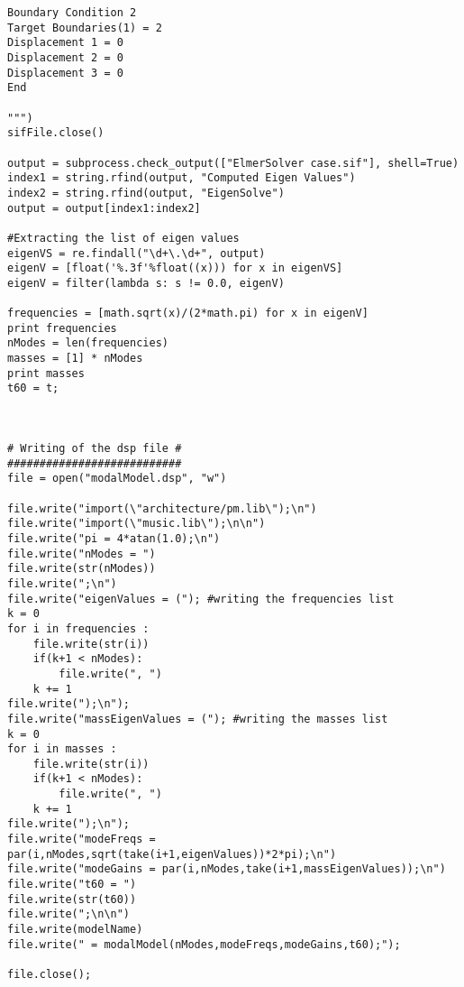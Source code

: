 \begin{lstlisting}
Boundary Condition 2
Target Boundaries(1) = 2
Displacement 1 = 0
Displacement 2 = 0
Displacement 3 = 0
End

""")
sifFile.close()
           
output = subprocess.check_output(["ElmerSolver case.sif"], shell=True)
index1 = string.rfind(output, "Computed Eigen Values")
index2 = string.rfind(output, "EigenSolve")
output = output[index1:index2]

#Extracting the list of eigen values
eigenVS = re.findall("\d+\.\d+", output)
eigenV = [float('%.3f'%float((x))) for x in eigenVS]
eigenV = filter(lambda s: s != 0.0, eigenV)

frequencies = [math.sqrt(x)/(2*math.pi) for x in eigenV]
print frequencies
nModes = len(frequencies)
masses = [1] * nModes
print masses
t60 = t;



# Writing of the dsp file #
###########################
file = open("modalModel.dsp", "w")

file.write("import(\"architecture/pm.lib\");\n")
file.write("import(\"music.lib\");\n\n")
file.write("pi = 4*atan(1.0);\n")
file.write("nModes = ")
file.write(str(nModes))
file.write(";\n")
file.write("eigenValues = ("); #writing the frequencies list
k = 0
for i in frequencies :
    file.write(str(i))
    if(k+1 < nModes):
        file.write(", ")
    k += 1
file.write(");\n");
file.write("massEigenValues = ("); #writing the masses list
k = 0
for i in masses :
    file.write(str(i))
    if(k+1 < nModes):
        file.write(", ")
    k += 1
file.write(");\n");
file.write("modeFreqs = par(i,nModes,sqrt(take(i+1,eigenValues))*2*pi);\n")
file.write("modeGains = par(i,nModes,take(i+1,massEigenValues));\n")
file.write("t60 = ")
file.write(str(t60))
file.write(";\n\n")
file.write(modelName)
file.write(" = modalModel(nModes,modeFreqs,modeGains,t60);");

file.close();
\end{lstlisting}
